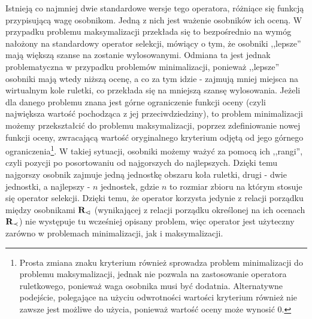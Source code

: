 \documentclass[./FM_mgr.tex]{subfiles}
\begin{document}
	Istnieją co najmniej dwie standardowe wersje tego operatora, różniące się funkcją przypisującą wagę osobnikom. 
	Jedną z nich jest ważenie osobników ich oceną.
	W przypadku problemu maksymalizacji przekłada się to bezpośrednio na wymóg nałożony na standardowy operator selekcji, mówiący o tym, że osobniki ,,lepsze'' mają większą szanse na zostanie wylosowanymi.
	Odmiana ta jest jednak problematyczna w przypadku problemów minimalizacji, ponieważ ,,lepsze'' osobniki mają wtedy niższą ocenę, a co za tym idzie - zajmują mniej miejsca na wirtualnym kole ruletki, co przekłada się na mniejszą szansę wylosowania.
	Jeżeli dla danego problemu znana jest górne ograniczenie funkcji oceny (czyli największa wartość pochodząca z jej przeciwdziedziny), to problem minimalizacji możemy przekształcić do problemu maksymalizacji, poprzez zdefiniowanie nowej funkcji oceny, zwracającą wartość oryginalnego kryterium odjętą od jego górnego ograniczenia\footnote{
		Prosta zmiana znaku kryterium również sprowadza problem minimalizacji do problemu maksymalizacji, jednak nie pozwala na zastosowanie operatora ruletkowego, ponieważ waga osobnika musi być dodatnia. 
		Alternatywne podejście, polegające na użyciu odwrotności wartości kryterium również nie zawsze jest możliwe do użycia, ponieważ wartość oceny może wynosić 0.
	}.
	W takiej sytuacji, osobniki możemy ważyć za pomocą ich ,,rangi'', czyli pozycji po posortowaniu od najgorszych do najlepszych.
	Dzięki temu najgorszy osobnik zajmuje jedną jednostkę obszaru koła ruletki, drugi - dwie jednostki, a najlepszy - $n$ jednostek, gdzie $n$ to rozmiar zbioru na którym stosuje się operator selekcji.
	Dzięki temu, że operator korzysta jedynie z relacji porządku między osobnikami ${\mathbf{R}}_{\lhd}$ (wynikającej z relacji porządku określonej na ich ocenach ${\mathbf{R}}_{\prec}$) nie występuje tu wcześniej opisany problem, więc operator jest użyteczny zarówno w problemach minimalizacji, jak i maksymalizacji.
	
\end{document}
